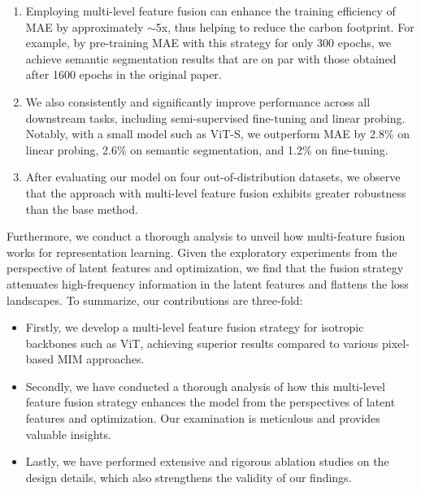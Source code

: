 \begin{enumerate}[label={\bf {{(\arabic*)}}},leftmargin=*,topsep=0.5ex,itemsep=-0.5ex,partopsep=0.75ex,parsep=0.75ex,partopsep=0pt,wide, labelwidth=0pt,labelindent=0pt]
    \item Employing multi-level feature fusion can enhance the training efficiency of MAE by approximately $\sim$5x, thus helping to reduce the carbon footprint. For example, by pre-training MAE with this strategy for only 300 epochs, we achieve semantic segmentation results that are on par with those obtained after 1600 epochs in the original paper. 
    \item We also consistently and significantly improve performance across all downstream tasks, including semi-supervised fine-tuning and linear probing. Notably, with a small model such as ViT-S, we outperform MAE by 2.8\% on linear probing, 2.6\% on semantic segmentation, and 1.2\% on fine-tuning.
    \item After evaluating our model on four out-of-distribution datasets, we observe that the approach with multi-level feature fusion exhibits greater robustness than the base method.
\end{enumerate}

Furthermore, we conduct a thorough analysis to unveil how multi-feature fusion works for representation learning. Given the exploratory experiments from the perspective of latent features and optimization, we find that the fusion strategy attenuates high-frequency information in the latent features and flattens the loss landscapes. To summarize, our contributions are three-fold:

\begin{itemize}[leftmargin=*,topsep=0pt,itemsep=0pt,noitemsep]
    \item Firstly, we develop a multi-level feature fusion strategy for isotropic backbones such as ViT, achieving superior results compared to various pixel-based MIM approaches.
    \item Secondly, we have conducted a thorough analysis of how this multi-level feature fusion strategy enhances the model from the perspectives of latent features and optimization. Our examination is meticulous and provides valuable insights.
    \item Lastly, we have performed extensive and rigorous ablation studies on the design details, which also strengthens the validity of our findings.
\end{itemize}

